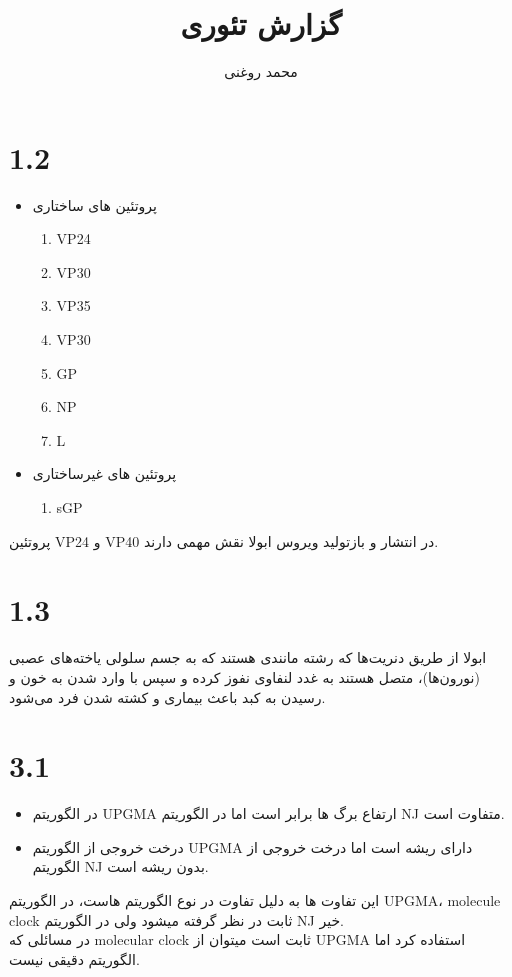 \documentclass[11pt, oneside]{article}
\title{گزارش تئوری}
\author{محمد روغنی}
\begin{document}
\maketitle
\section*{1.2}
\begin{itemize}
\item پروتئین های ساختاری
\cite{stru}
\begin{enumerate}
\item VP24
\item VP30
\item VP35
\item VP30
\item GP
\item NP
\item L

\end{enumerate}
\item پروتئین های غیرساختاری
\begin{enumerate}
\item sGP
\end{enumerate}
\end{itemize}
پروتئین VP24 و VP40 در انتشار و بازتولید ویروس ابولا نقش مهمی دارند.
\section*{1.3}
ابولا از طریق دنریت‌ها که رشته مانندی هستند که به جسم سلولی یاخته‌های عصبی (نورون‌ها)، متصل هستند به غدد لنفاوی نفوز کرده و سپس با وارد شدن به خون و رسیدن به کبد باعث بیماری و کشته شدن فرد می‌شود.
\cite{ebola}

\section*{3.1}
\begin{itemize}
\item در الگوریتم UPGMA ارتفاع برگ ها برابر است اما در الگوریتم NJ متفاوت است.
\item درخت خروجی از الگوریتم UPGMA دارای ریشه است اما درخت خروجی از الگوریتم NJ بدون ریشه است.
\end{itemize}
این تفاوت ها به دلیل تفاوت در نوع الگوریتم هاست، در الگوریتم UPGMA، molecule clock ثابت در نظر گرفته میشود ولی در الگوریتم NJ خیر.\\
در مسائلی که molecular clock ثابت است میتوان از UPGMA استفاده کرد اما الگوریتم دقیقی نیست.
\cite{upgmanj}
\end{document}
